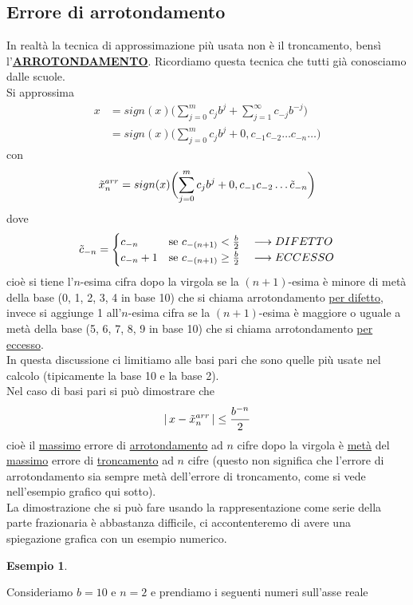 \documentclass[12pt]{article}
\newtheorem*{esempio}{Esempio}
\begin{document}
\subsection{Errore di arrotondamento}
In realtà la tecnica di approssimazione più usata non è il troncamento, bensì l'\uline{\textbf{ARROTONDAMENTO}}. Ricordiamo questa tecnica che tutti già conosciamo dalle scuole. \\
Si approssima 
\[ \begin{split}
    x & = sign(x)\biggl( \sum_{j=0}^m c_j b^j + \sum_{j=1}^\infty c_{-j} b^{-j} \biggr) \\
    & = sign(x) \biggl( \sum_{j=0}^m c_j b^j + 0,c_{-1}c_{-2} \dotsc c_{-n} \dotsc \biggr) 
\end{split} \]
con \[ \Tilde{x}_n^{arr} = sign(x) \biggl( \sum_{j=0}^m c_j b^j + 0,c_{-1}c_{-2} \dotsc \Tilde{c}_{-n} \biggr) \]
dove \[\Tilde{c}_{-n} = 
\begin{cases}
    c_{-n} & \text{se $c_{-(n+1)} < \frac{b}{2} \quad \longrightarrow DIFETTO$} \\
    c_{-n}+1 & \text{se $c_{-(n+1)} \ge \frac{b}{2} \quad \longrightarrow ECCESSO$}
\end{cases}
\]
cioè si tiene l'$n$-esima cifra dopo la virgola se la $(n+1)$-esima è minore di metà della base (0, 1, 2, 3, 4 in base 10) che si chiama arrotondamento \uline{per difetto}, invece si aggiunge 1 all'$n$-esima cifra se la $(n+1)$-esima è maggiore o uguale a metà della base (5, 6, 7, 8, 9 in base 10) che si chiama arrotondamento \uline{per eccesso}.\\
In questa discussione ci limitiamo alle basi pari che sono quelle più usate nel calcolo (tipicamente la base 10 e la base 2). \\
Nel caso di basi pari si può dimostrare che
\[ \lvert \, x - \Tilde{x}_n^{arr} \,\rvert \le \frac{b^{-n}}{2}\]
cioè il \uline{massimo} errore di \uline{arrotondamento} ad $n$ cifre dopo la virgola è \uline{metà} del \uline{massimo} errore di \uline{troncamento} ad $n$ cifre (questo non significa che l'errore di arrotondamento sia sempre metà dell'errore di troncamento, come si vede nell'esempio grafico qui sotto).\\
La dimostrazione che si può fare usando la rappresentazione come serie della parte frazionaria è abbastanza difficile, ci accontenteremo di avere una spiegazione grafica con un esempio numerico.
\begin{esempio} \end{esempio}
Consideriamo $b=10$ e $n=2$ e prendiamo i seguenti numeri sull'asse reale 
\end{document}
